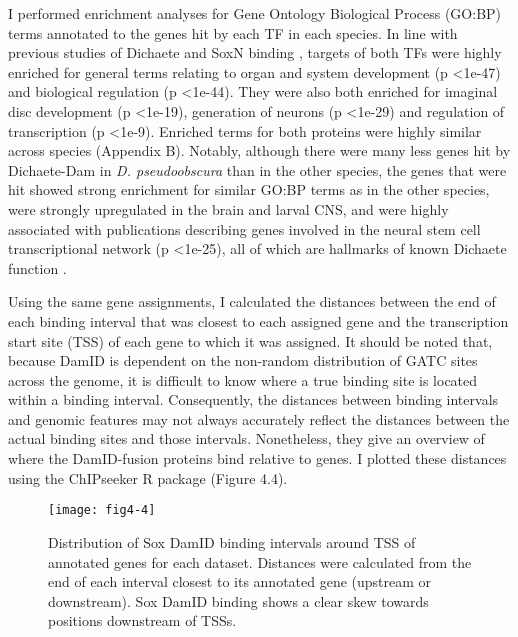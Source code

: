 I performed enrichment analyses for Gene Ontology Biological Process (GO:BP) terms annotated to the genes hit by each TF in each species. In line with previous studies of Dichaete and SoxN binding \citep{aleksic_role_2013,ferrero_soxneuro_2014}, targets of both TFs were highly enriched for general terms relating to organ and system development (p \textless 1e-47) and biological regulation (p \textless 1e-44). They were also both enriched for imaginal disc development (p \textless 1e-19), generation of neurons (p \textless 1e-29) and regulation of transcription (p \textless 1e-9). Enriched terms for both proteins were highly similar across species (Appendix B). Notably, although there were many less genes hit by Dichaete-Dam in \emph{D. pseudoobscura} than in the other species, the genes that were hit showed strong enrichment for similar GO:BP terms as in the other species, were strongly upregulated in the brain and larval CNS, and were highly associated with publications describing genes involved in the neural stem cell transcriptional network (p \textless 1e-25), all of which are hallmarks of known Dichaete function \citep{aleksic_role_2013,shen_identifying_2013,soriano_drosophila_1998}.

Using the same gene assignments, I calculated the distances between the end of each binding interval that was closest to each assigned gene and the transcription start site (TSS) of each gene to which it was assigned. It should be noted that, because DamID is dependent on the non-random distribution of GATC sites across the genome, it is difficult to know where a true binding site is located within a binding interval. Consequently, the distances between binding intervals and genomic features may not always accurately reflect the distances between the actual binding sites and those intervals. Nonetheless, they give an overview of where the DamID-fusion proteins bind relative to genes. I plotted these distances using the ChIPseeker R package \citep{yu_chipseeker_2014} (Figure 4.4).

\begin{figure}
\centering
\texttt{[image: fig4-4]}
\caption[Distribution of Sox DamID binding intervals around TSS of annotated genes]{Distribution of Sox DamID binding intervals around TSS of annotated genes for each dataset. Distances were calculated from the end of each interval closest to its annotated gene (upstream or downstream). Sox DamID binding shows a clear skew towards positions downstream of TSSs.}
\label{Figure 4.4}
\end{figure}

